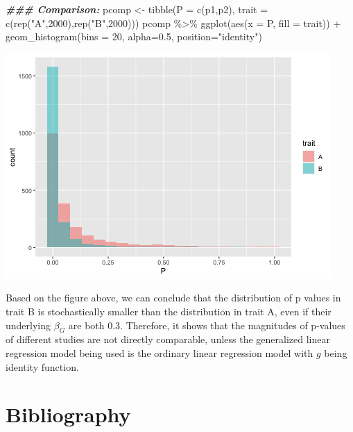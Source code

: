 \documentclass[
]{article}
\newenvironment{Shaded}{\begin{snugshade}}{\end{snugshade}}
\newcommand{\AttributeTok}[1]{\textcolor[rgb]{0.77,0.63,0.00}{#1}}
\newcommand{\DecValTok}[1]{\textcolor[rgb]{0.00,0.00,0.81}{#1}}
\newcommand{\DocumentationTok}[1]{\textcolor[rgb]{0.56,0.35,0.01}{\textbf{\textit{#1}}}}
\newcommand{\FloatTok}[1]{\textcolor[rgb]{0.00,0.00,0.81}{#1}}
\newcommand{\FunctionTok}[1]{\textcolor[rgb]{0.00,0.00,0.00}{#1}}
\newcommand{\NormalTok}[1]{#1}
\newcommand{\OtherTok}[1]{\textcolor[rgb]{0.56,0.35,0.01}{#1}}
\newcommand{\SpecialCharTok}[1]{\textcolor[rgb]{0.00,0.00,0.00}{#1}}
\newcommand{\StringTok}[1]{\textcolor[rgb]{0.31,0.60,0.02}{#1}}
\begin{document}
\begin{Shaded}
\begin{Highlighting}[]
\DocumentationTok{\#\#\# Comparison:}
\NormalTok{pcomp }\OtherTok{\textless{}{-}} \FunctionTok{tibble}\NormalTok{(}\AttributeTok{P =} \FunctionTok{c}\NormalTok{(p1,p2), }\AttributeTok{trait =} \FunctionTok{c}\NormalTok{(}\FunctionTok{rep}\NormalTok{(}\StringTok{"A"}\NormalTok{,}\DecValTok{2000}\NormalTok{),}\FunctionTok{rep}\NormalTok{(}\StringTok{"B"}\NormalTok{,}\DecValTok{2000}\NormalTok{)))}
\NormalTok{pcomp }\SpecialCharTok{\%\textgreater{}\%} \FunctionTok{ggplot}\NormalTok{(}\FunctionTok{aes}\NormalTok{(}\AttributeTok{x =}\NormalTok{ P, }\AttributeTok{fill =}\NormalTok{ trait)) }\SpecialCharTok{+} \FunctionTok{geom\_histogram}\NormalTok{(}\AttributeTok{bins =} \DecValTok{20}\NormalTok{, }\AttributeTok{alpha=}\FloatTok{0.5}\NormalTok{, }\AttributeTok{position=}\StringTok{"identity"}\NormalTok{)}
\end{Highlighting}
\end{Shaded}

\includegraphics{GWAS-Pvalues_files/figure-latex/visualization-1.png}

Based on the figure above, we can conclude that the distribution of p
values in trait B is stochastically smaller than the distribution in
trait A, even if their underlying \(\beta_G\) are both \(0.3\).
Therefore, it shows that the magnitudes of p-values of different studies
are not directly comparable, unless the generalized linear regression
model being used is the ordinary linear regression model with \(g\)
being identity function.

\clearpage

\hypertarget{bibliography}{%
\section{Bibliography}\label{bibliography}}
\end{document}
